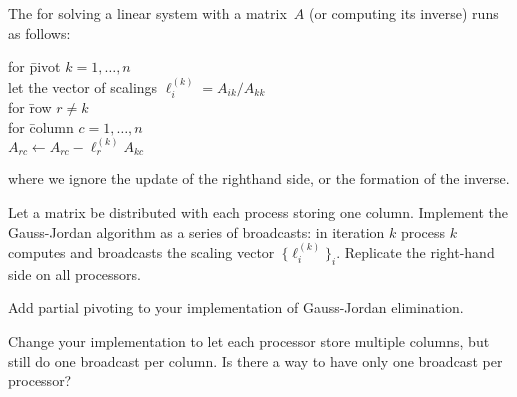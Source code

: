 \begin{exercise}
  \label{ex:gaussjordancoll}
  The  for solving a linear system
  with a matrix~$A$ (or computing its inverse) runs as follows:
  \begin{tabbing}
    for \=pivot $k=1,\ldots,n$\\
    \>let the vector of scalings $\ell^{(k)}_i=A_{ik}/A_{kk}$\\
    \>for \=row $r\not=k$\\
    \>\>for \=column $c=1,\ldots,n$\\
    \>\>\> $A_{rc}\leftarrow A_{rc} - \ell^{(k)}_r A_{kc}$\\
  \end{tabbing}
  where we ignore the update of the righthand side, or the formation
  of the inverse.

  Let a matrix be distributed with each process storing one
  column. Implement the Gauss-Jordan algorithm as a series of
  broadcasts: in iteration $k$ process $k$ computes and broadcasts the
  scaling vector~$\{\ell^{(k)}_i\}_i$. Replicate the right-hand side on
  all processors.
\end{exercise}

\begin{exercise}
  Add partial pivoting to your implementation of Gauss-Jordan elimination.

  Change your implementation to let each processor store multiple columns,
  but still do one broadcast per column. Is there a way to have only one
  broadcast per processor?
\end{exercise}

